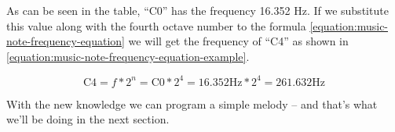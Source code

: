 \documentclass[../sparc.tex]{subfiles}
\begin{document}
As can be seen in the table, ``C0'' has the frequency 16.352 Hz.  If we
substitute this value along with the fourth octave number to the formula
\ref{equation:music-note-frequency-equation} we will get the frequency of ``C4''
as shown in \ref{equation:music-note-frequency-equation-example}.

\begin{equation}
  \mbox{C4} = f * 2^n = \mbox{C0} * 2^4 = 16.352\mbox{Hz} * 2^4 = 261.632\mbox{Hz}
  \label{equation:music-note-frequency-equation-example}
\end{equation}

With the new knowledge we can program a simple melody -- and that's what we'll be
doing in the next section.
\end{document}

